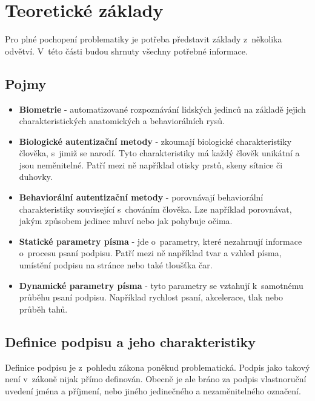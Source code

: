 
\chapter{Teoretické základy}
Pro plné pochopení problematiky je potřeba představit základy z~několika odvětví. 
V~této části budou shrnuty všechny potřebné informace. 

\section{Pojmy}
\label{sec:pojmy}
\begin{itemize}
  \item{\textbf{Biometrie} - automatizované rozpoznávání lidských jedinců na základě jejich charakteristických anatomických a behaviorálních rysů.} %
  \item{\textbf{Biologické autentizační metody} - zkoumají biologické charakteristiky člověka, s~jimiž se narodí. Tyto charakteristiky má každý člověk unikátní a jsou neměnitelné. Patří mezi ně například otisky prstů, skeny sítnice či duhovky.}  
  \item{\textbf{Behaviorální autentizační metody} - porovnávají behaviorální charakteristiky související s~chováním člověka. Lze například porovnávat, jakým způsobem jedinec mluví nebo jak pohybuje očima.}
  \item{\textbf{Statické parametry písma} - jde o~parametry, které nezahrnují informace o~procesu psaní podpisu. Patří mezi ně například tvar a vzhled písma, umístění podpisu na stránce nebo také tloušťka čar.}
  \item{\textbf{Dynamické parametry písma} - tyto parametry se vztahují k~samotnému průběhu psaní podpisu. Například rychlost psaní, akcelerace, tlak nebo průběh tahů.}
\end{itemize}

\section{Definice podpisu a jeho charakteristiky}
Definice podpisu je z~pohledu zákona poněkud problematická. 
Podpis jako takový není v~zákoně nijak přímo definován. 
Obecně je ale bráno za podpis vlastnoruční uvedení jména a příjmení, nebo jiného jedinečného a nezaměnitelného označení. %

